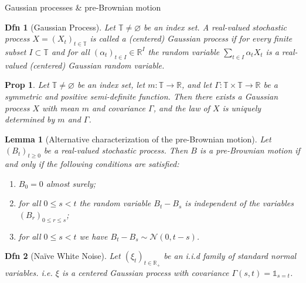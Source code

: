 \documentclass[a4paper]{article}
\title{}
\author{}
\theoremstyle{mytheoremstyle}
\newtheorem{definition}{Dfn}
\newtheorem{lemma}{Lemma}
\newtheorem{proposition}{Prop}
\newcommand{\R}{\mathbb{R}}
\newcommand{\1}{\mathds{1}}
\begin{document}
\begin{multicols*}{3}

\begin{roundbox}{Gaussian processes \& pre-Brownian motion}
  \begin{definition}[Gaussian Process]
    Let $\mathbb{T} \neq \varnothing$ be an index set. A real-valued
    stochastic process $X =
    (X_t)_{t \in \mathbb{T}}$ is called a {\emph{(centered) Gaussian
    process}} if for every
    finite subset $I \subset \mathbb{T}$ and for all $(\alpha_t)_{t
    \in I} \in \mathbb{R}^I$
    the random variable $\sum_{t \in I} \alpha_t X_t$ is a
    real-valued (centered) Gaussian
    random variable.
  \end{definition}

  \begin{proposition}
    Let $\mathbb{T} \neq \varnothing$ be an index set, let $m :
    \mathbb{T} \rightarrow
    \mathbb{R}$, and let $\Gamma : \mathbb{T} \times \mathbb{T} \to
    \mathbb{R}$ be a
    symmetric and positive semi-definite function. Then there exists
    a Gaussian process $X$
    with mean $m$ and covariance $\Gamma$, and the law of $X$ is
    uniquely determined by $m$
    and $\Gamma$.
  \end{proposition}

  \begin{lemma}[Alternative characterization of the pre-Brownian motion]
    \label{lem:pre-Brownian}Let $(B_t)_{t \geqslant 0}$ be a
    real-valued stochastic process.
    Then $B$ is a pre-Brownian motion if and only if the following
    conditions are satisfied:
    \begin{enumerate}
      \item $B_0 = 0$ almost surely;

      \item for all $0 \leqslant s < t$ the random variable $B_t -
        B_s$ is independent of
        the variables $(B_r)_{0 \leqslant r \leqslant s}$;

      \item for all $0 \leqslant s < t$ we have $B_t - B_s \sim
        \mathcal{N} (0, t - s)$.
    \end{enumerate}
  \end{lemma}

  \begin{definition}[Naïve White Noise]
    Let $(\xi_t)_{t \in \R_+}$ be an i.i.d family of standard normal
    variables. i.e. $\xi$
    is a centered Gaussian process with covariance $\Gamma(s, t) = \1_{s=t}$.
  \end{definition}


\end{roundbox}
\end{multicols*}
\end{document}
